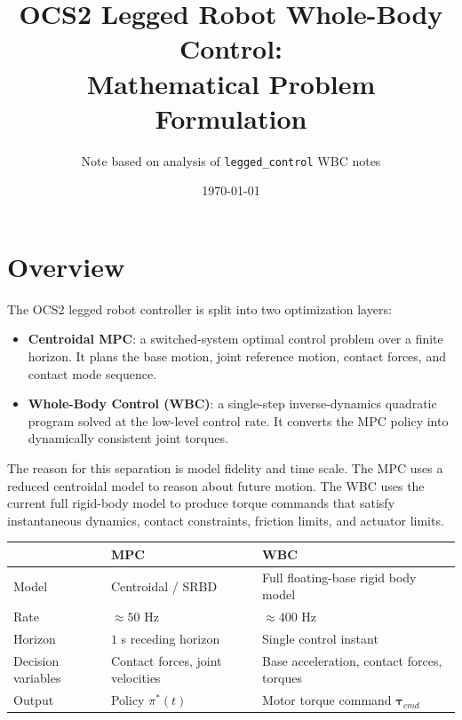 \documentclass[11pt,a4paper]{article}
\title{OCS2 Legged Robot Whole-Body Control: \\Mathematical Problem Formulation}
\author{Note based on analysis of \texttt{legged\_control} WBC notes}
\date{\today}
\begin{document}
\maketitle
\tableofcontents
\newpage


\section{Overview}

The OCS2 legged robot controller is split into two optimization layers:
\begin{itemize}
	\item \textbf{Centroidal MPC}: a switched-system optimal control problem over a finite horizon. It plans the base motion, joint reference motion, contact forces, and contact mode sequence.
	\item \textbf{Whole-Body Control (WBC)}: a single-step inverse-dynamics quadratic program solved at the low-level control rate. It converts the MPC policy into dynamically consistent joint torques.
\end{itemize}

The reason for this separation is model fidelity and time scale. The MPC uses a reduced centroidal model to reason about future motion. The WBC uses the current full rigid-body model to produce torque commands that satisfy instantaneous dynamics, contact constraints, friction limits, and actuator limits.

\begin{center}
	\begin{tabular}{lll}
		\toprule
		& \textbf{MPC} & \textbf{WBC} \\
		\midrule
		Model & Centroidal / SRBD & Full floating-base rigid body model \\
		Rate & $\approx 50$ Hz & $\approx 400$ Hz \\
		Horizon & $1$ s receding horizon & Single control instant \\
		Decision variables & Contact forces, joint velocities & Base acceleration, contact forces, torques \\
		Output & Policy $\pi^*(t)$ & Motor torque command $\bm{\tau}_{cmd}$ \\
		\bottomrule
	\end{tabular}
\end{center}
\end{document}

